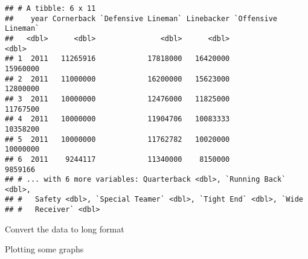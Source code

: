 \documentclass[]{article}
\newenvironment{Shaded}{\begin{snugshade}}{\end{snugshade}}
\newcommand{\KeywordTok}[1]{\textcolor[rgb]{0.13,0.29,0.53}{\textbf{#1}}}
\newcommand{\DataTypeTok}[1]{\textcolor[rgb]{0.13,0.29,0.53}{#1}}
\newcommand{\DecValTok}[1]{\textcolor[rgb]{0.00,0.00,0.81}{#1}}
\newcommand{\StringTok}[1]{\textcolor[rgb]{0.31,0.60,0.02}{#1}}
\newcommand{\OperatorTok}[1]{\textcolor[rgb]{0.81,0.36,0.00}{\textbf{#1}}}
\newcommand{\NormalTok}[1]{#1}
\begin{document}
\begin{verbatim}
## # A tibble: 6 x 11
##    year Cornerback `Defensive Lineman` Linebacker `Offensive Lineman`
##   <dbl>      <dbl>               <dbl>      <dbl>               <dbl>
## 1  2011   11265916            17818000   16420000            15960000
## 2  2011   11000000            16200000   15623000            12800000
## 3  2011   10000000            12476000   11825000            11767500
## 4  2011   10000000            11904706   10083333            10358200
## 5  2011   10000000            11762782   10020000            10000000
## 6  2011    9244117            11340000    8150000             9859166
## # ... with 6 more variables: Quarterback <dbl>, `Running Back` <dbl>,
## #   Safety <dbl>, `Special Teamer` <dbl>, `Tight End` <dbl>, `Wide
## #   Receiver` <dbl>
\end{verbatim}

Convert the data to long format

\begin{Shaded}
\end{Shaded}

Plotting some graphs
\end{document}
